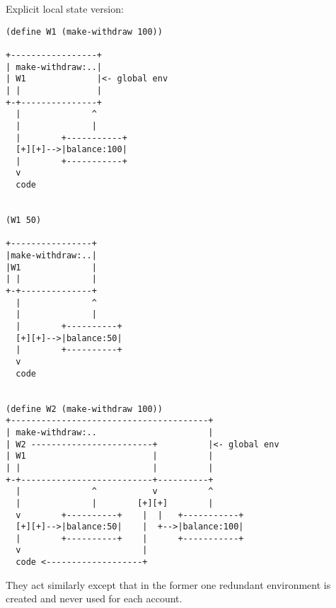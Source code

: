 \documentclass[../main.tex]{subfiles}
\begin{document}
Explicit local state version:

\begin{lstlisting}
(define W1 (make-withdraw 100))

+-----------------+
| make-withdraw:..|
| W1              |<- global env
| |               |
+-+---------------+
  |              ^
  |              |
  |        +-----------+
  [+][+]-->|balance:100|
  |        +-----------+
  v
  code


(W1 50)

+----------------+
|make-withdraw:..|
|W1              |
| |              |
+-+--------------+
  |              ^
  |              |
  |        +----------+
  [+][+]-->|balance:50|
  |        +----------+
  v
  code


(define W2 (make-withdraw 100))
+---------------------------------------+
| make-withdraw:..                      |
| W2 ------------------------+          |<- global env
| W1                         |          |
| |                          |          |
+-+--------------------------+----------+
  |              ^           v          ^
  |              |        [+][+]        |
  v        +----------+    |  |   +-----------+
  [+][+]-->|balance:50|    |  +-->|balance:100|
  |        +----------+    |      +-----------+
  v                        |
  code <-------------------+
\end{lstlisting}

They act similarly except that in the former one
 redundant environment is created and never used
 for each account.
\end{document}
